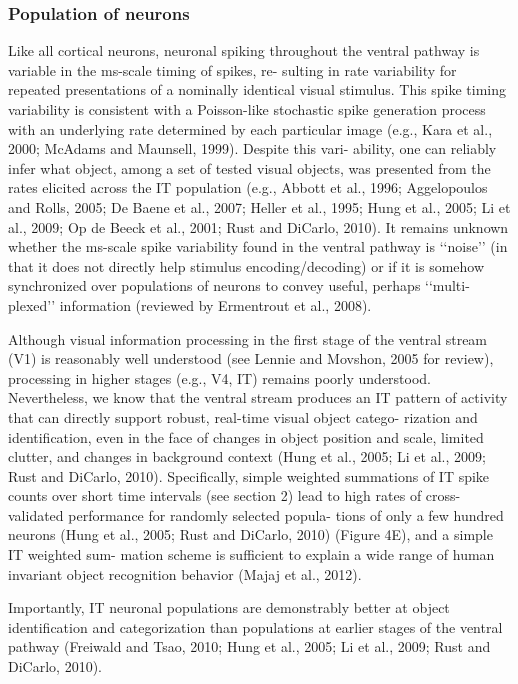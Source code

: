 \subsubsection{Population of neurons}
Like all cortical neurons, neuronal spiking throughout the
ventral pathway is variable in the ms-scale timing of spikes, re-
sulting in rate variability for repeated presentations of a nominally
identical visual stimulus. This spike timing variability is consistent
with a Poisson-like stochastic spike generation process with an
underlying rate determined by each particular image (e.g., Kara
et al., 2000; McAdams and Maunsell, 1999). Despite this vari-
ability, one can reliably infer what object, among a set of tested
visual objects, was presented from the rates elicited across the
IT population (e.g., Abbott et al., 1996; Aggelopoulos and Rolls,
2005; De Baene et al., 2007; Heller et al., 1995; Hung et al., 2005;
Li et al., 2009; Op de Beeck et al., 2001; Rust and DiCarlo, 2010).
It remains unknown whether the ms-scale spike variability found
in the ventral pathway is ‘‘noise’’ (in that it does not directly help
stimulus encoding/decoding) or if it is somehow synchronized
over populations of neurons to convey useful, perhaps ‘‘multi-plexed’’ information (reviewed by Ermentrout et al., 2008).

Although visual information processing in the first stage of the
ventral stream (V1) is reasonably well understood (see Lennie
and Movshon, 2005 for review), processing in higher stages
(e.g., V4, IT) remains poorly understood. Nevertheless, we
know that the ventral stream produces an IT pattern of activity
that can directly support robust, real-time visual object catego-
rization and identification, even in the face of changes in object
position and scale, limited clutter, and changes in background
context (Hung et al., 2005; Li et al., 2009; Rust and DiCarlo,
2010). Specifically, simple weighted summations of IT spike
counts over short time intervals (see section 2) lead to high rates
of cross-validated performance for randomly selected popula-
tions of only a few hundred neurons (Hung et al., 2005; Rust
and DiCarlo, 2010) (Figure 4E), and a simple IT weighted sum-
mation scheme is sufficient to explain a wide range of human
invariant object recognition behavior (Majaj et al., 2012).

Importantly, IT neuronal populations are demonstrably better
at object identification and categorization than populations
at earlier stages of the ventral pathway (Freiwald and Tsao,
2010; Hung et al., 2005; Li et al., 2009; Rust and DiCarlo,
2010).

